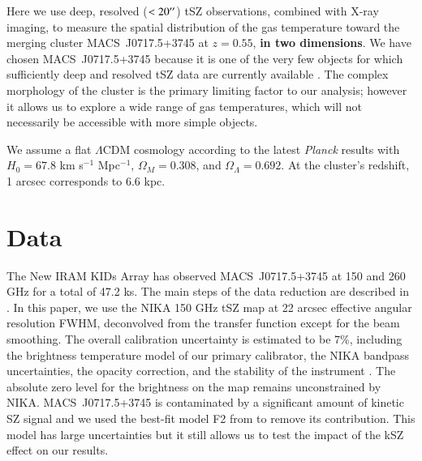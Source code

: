 \documentclass[twocolumn,traditabstract]{aa}
\begin{document}
Here we use deep, resolved ($< 20\hbox{$^{\prime\prime}$}$) tSZ observations, combined with X-ray imaging, to measure the spatial distribution of the gas temperature toward the merging cluster \mbox{MACS~J0717.5+3745} at $z=0.55$, {\bf in two dimensions}. We have chosen \mbox{MACS~J0717.5+3745} because it is one of the very few objects for which sufficiently deep and resolved tSZ data are currently available \citep{Adam2016b}. The complex morphology of the cluster is the primary limiting factor to our analysis; however it allows us to explore a wide range of gas temperatures, which will not necessarily be accessible with more simple objects.

We assume a flat $\Lambda$CDM cosmology according to the latest {\it Planck} results \citep{Planck2015XIII} with $H_0 = 67.8$ km s$^{-1}$ Mpc$^{-1}$, $\Omega_M = 0.308$, and $\Omega_{\Lambda} = 0.692$. At the cluster's redshift, 1 arcsec corresponds to 6.6 kpc.

\section{Data}\label{sec:data}
The New IRAM KIDs Array \citep[NIKA, see][]{Monfardini2011,Calvo2013,Adam2014,Catalano2014} has observed \mbox{MACS~J0717.5+3745} at 150 and 260 GHz for a total of 47.2 ks. The main steps of the data reduction are described in \cite{Adam2015,Adam2016a,Adam2016b,Ruppin2016}. In this paper, we use the NIKA 150 GHz tSZ map at 22 arcsec effective angular resolution FWHM, deconvolved from the transfer function except for the beam smoothing. The overall calibration uncertainty is estimated to be 7\%, including the brightness temperature model of our primary calibrator, the NIKA bandpass uncertainties, the opacity correction, and the stability of the instrument \citep{Catalano2014}. The absolute zero level for the brightness on the map remains unconstrained by NIKA. \mbox{MACS~J0717.5+3745} is contaminated by a significant amount of kinetic SZ \citep[kSZ,][]{Sunyaev1980} signal and we used the best-fit model F2 from \cite{Adam2016b} to remove its contribution. This model has large uncertainties but it still allows us to test the impact of the kSZ effect on our results.
\end{document}
